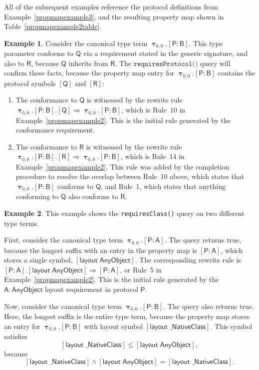 \documentclass[a4paper,headsepline,bibliography=totoc,toc=flat,fleqn,twoside=semi]{scrbook}
\theoremstyle{definition}
\theoremstyle{definition}
\newtheorem{example}{Example}[chapter]
\theoremstyle{definition}
\newcommand{\namesym}[1]{\mathsf{#1}}
\newcommand{\proto}[1]{\bm{\mathsf{#1}}}
\newcommand{\protosym}[1]{[\proto{#1}]}
\newcommand{\genericsym}[2]{\bm{\uptau}_{#1,#2}}
\newcommand{\assocsym}[2]{[\proto{#1}\colon\namesym{#2}]}
\newcommand{\layoutsym}[1]{[\mathsf{layout\;#1}]}
\begin{document}
All of the subsequent examples reference the protocol definitions from Example~\ref{propmapexample3}, and the resulting property map shown in Table~\ref{propmapexample2table}.
\begin{example} Consider the canonical type term $\genericsym{0}{0}.\assocsym{P}{B}$. This type parameter conforms to $\proto{Q}$ via a requirement stated in the generic signature, and also to $\proto{R}$, because $\proto{Q}$ inherits from $\proto{R}$. The $\texttt{requiresProtocol()}$ query will confirm these facts, because the property map entry for $\genericsym{0}{0}.\assocsym{P}{B}$ contains the protocol symbols $\protosym{Q}$ and $\protosym{R}$:
\begin{enumerate}
\item The conformance to $\proto{Q}$ is witnessed by the rewrite rule $\genericsym{0}{0}.\assocsym{P}{B}.\protosym{Q}\Rightarrow \genericsym{0}{0}.\assocsym{P}{B}$, which is Rule~10 in Example~\ref{propmapexample2}. This is the initial rule generated by the conformance requirement.
\item The conformance to $\proto{R}$ is witnessed by the rewrite rule $\genericsym{0}{0}.\assocsym{P}{B}.\protosym{R}\Rightarrow \genericsym{0}{0}.\assocsym{P}{B}$, which is Rule~14 in Example~\ref{propmapexample2}. This rule was added by the completion procedure to resolve the overlap between Rule~10 above, which states that $\genericsym{0}{0}.\assocsym{P}{B}$ conforms to $\proto{Q}$, and Rule~1, which states that anything conforming to $\proto{Q}$ also conforms to $\proto{R}$.
\end{enumerate}
\end{example}
\begin{example} This example shows the \texttt{requiresClass()} query on two different type terms.

First, consider the canonical type term $\genericsym{0}{0}.\assocsym{P}{A}$. The query returns true, because the longest suffix with an entry in the property map is $\assocsym{P}{A}$, which stores a single symbol, $\layoutsym{AnyObject}$. The corresponding rewrite rule is $\assocsym{P}{A}.\layoutsym{AnyObject}\Rightarrow\assocsym{P}{A}$, or Rule~5 in Example~\ref{propmapexample2}. This is the initial rule generated by the $\namesym{A}\colon\namesym{AnyObject}$ layout requirement in protocol $\proto{P}$.

Now, consider the canonical type term $\genericsym{0}{0}.\assocsym{P}{B}$. The query also returns true. Here, the longest suffix is the entire type term, because the property map stores an entry for $\genericsym{0}{0}.\assocsym{P}{B}$ with layout symbol $\layoutsym{\_NativeClass}$. This symbol satisfies
\[\layoutsym{\_NativeClass}\leq\layoutsym{AnyObject},\]
because
\[\layoutsym{\_NativeClass}\wedge \layoutsym{AnyObject}=\layoutsym{\_NativeClass}.\]
\end{example}
\end{document}
